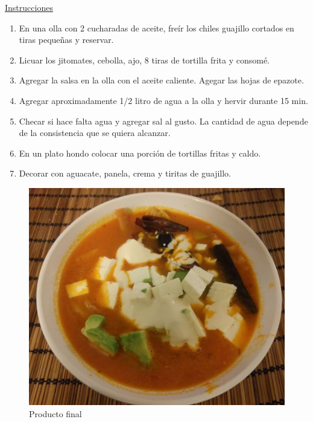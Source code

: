 \underline{Instrucciones}
\begin{enumerate}
\item En una olla con 2 cucharadas de aceite, freír los chiles guajillo cortados en tiras pequeñas y reservar.
\item Licuar los jitomates, cebolla, ajo, 8 tiras de tortilla frita y consomé.
\item Agregar la salsa en la olla con el aceite caliente. Agegar las hojas de epazote.
\item Agregar aproximadamente 1/2 litro de agua a la olla y hervir durante 15 min.
\item Checar si hace falta agua y agregar sal al gusto. La cantidad de agua depende de la consistencia que se quiera alcanzar.
\item En un plato hondo colocar una porción de tortillas fritas y caldo.
\item Decorar con aguacate, panela, crema y tiritas de guajillo.
\end{enumerate}


\begin{figure}[H]
\centering
\includegraphics[scale=0.2]{recetas/sopa-de-tortilla/figures/sopa_tortilla}
\caption{Producto final}
\end{figure}

